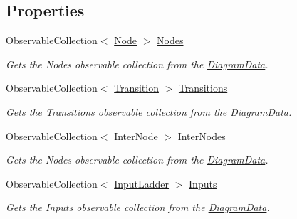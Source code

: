 \subsection*{Properties}
\begin{DoxyCompactItemize}
\item 
Observable\+Collection$<$ \hyperlink{class_prototipo_t_f_g_1_1_node}{Node} $>$ \hyperlink{class_prototipo_t_f_g_1_1_main_view_model_a2acdc08147f50d7a8371190fa1960d0d}{Nodes}
\begin{DoxyCompactList}\small\item\em Gets the Nodes observable collection from the \hyperlink{class_prototipo_t_f_g_1_1_diagram_data}{Diagram\+Data}. \end{DoxyCompactList}\item 
Observable\+Collection$<$ \hyperlink{class_prototipo_t_f_g_1_1_transition}{Transition} $>$ \hyperlink{class_prototipo_t_f_g_1_1_main_view_model_a4103c6effdcf319086110b26b7de146f}{Transitions}
\begin{DoxyCompactList}\small\item\em Gets the Transitions observable collection from the \hyperlink{class_prototipo_t_f_g_1_1_diagram_data}{Diagram\+Data}. \end{DoxyCompactList}\item 
Observable\+Collection$<$ \hyperlink{class_prototipo_t_f_g_1_1_inter_node}{Inter\+Node} $>$ \hyperlink{class_prototipo_t_f_g_1_1_main_view_model_a9d1162ef26fcdc6beadb217bea2a85e7}{Inter\+Nodes}
\begin{DoxyCompactList}\small\item\em Gets the Nodes observable collection from the \hyperlink{class_prototipo_t_f_g_1_1_diagram_data}{Diagram\+Data}. \end{DoxyCompactList}\item 
Observable\+Collection$<$ \hyperlink{class_prototipo_t_f_g_1_1_input_ladder}{Input\+Ladder} $>$ \hyperlink{class_prototipo_t_f_g_1_1_main_view_model_ab9088a1a4c50cf9579255659265c432f}{Inputs}
\begin{DoxyCompactList}\small\item\em Gets the Inputs observable collection from the \hyperlink{class_prototipo_t_f_g_1_1_diagram_data}{Diagram\+Data}. \end{DoxyCompactList}\item 

\end{DoxyCompactItemize}
